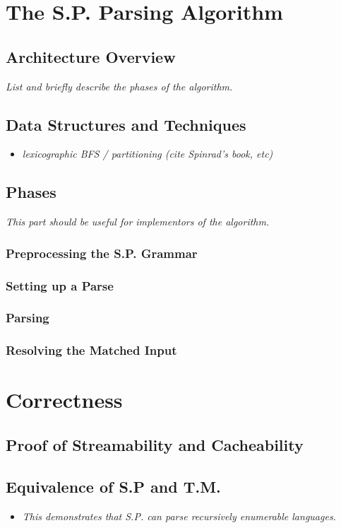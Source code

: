 \documentclass{article}
\begin{document}
\section{The S.P. Parsing Algorithm}
\subsection{Architecture Overview}
\textit{List and briefly describe the phases of the algorithm.}

\subsection{Data Structures and Techniques}
\begin{itemize}
  \item \textit{lexicographic BFS / partitioning (cite Spinrad's book, etc)}
\end{itemize}

\subsection{Phases}
\textit{This part should be useful for implementors of the algorithm.}
\subsubsection{Preprocessing the S.P. Grammar}
\subsubsection{Setting up a Parse}
\subsubsection{Parsing}
\subsubsection{Resolving the Matched Input}

\section{Correctness}
\subsection{Proof of Streamability and Cacheability}
\subsection{Equivalence of S.P and T.M.}
\begin{itemize}
  \item \textit{This demonstrates that S.P. can parse recursively enumerable languages.}
\end{itemize}
\end{document}
